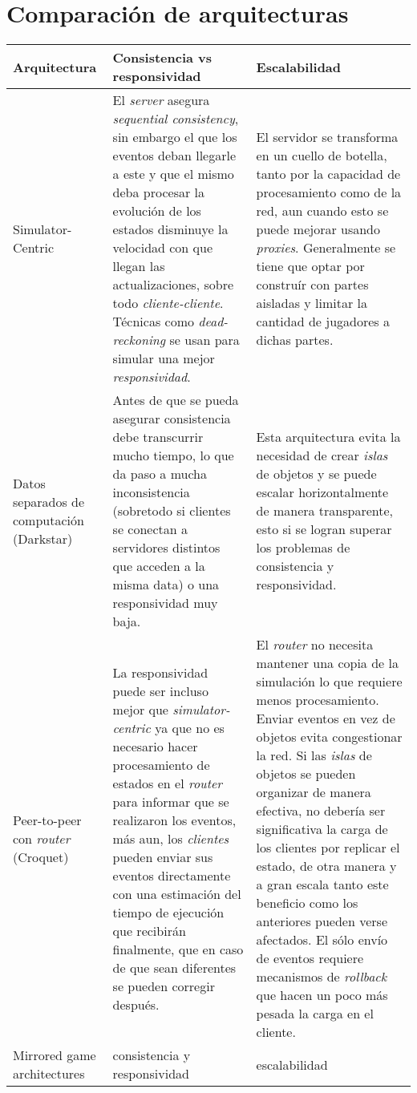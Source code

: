 \section{Comparación de arquitecturas}

%

\small
\begin{longtable}{|p{3cm}|p{6cm}|p{6cm}|}
\hline
\textbf{Arquitectura} & \textbf{Consistencia vs responsividad} & \textbf{Escalabilidad} \\ \hline
Simulator-Centric &
El \emph{server} asegura \emph{sequential consistency}, sin embargo el que los eventos deban llegarle a este y que el mismo deba procesar la evolución de los estados disminuye la velocidad con que llegan las actualizaciones, sobre todo \emph{cliente-cliente}. Técnicas como \emph{dead-reckoning} se usan para simular una mejor \emph{responsividad}. &
El servidor se transforma en un cuello de botella, tanto por la capacidad de procesamiento como de la red, aun cuando esto se puede mejorar usando \emph{proxies}. Generalmente se tiene que optar por construír con partes aisladas y limitar la cantidad de jugadores a dichas partes. \\
\hline
Datos separados de computación (Darkstar) &
Antes de que se pueda asegurar consistencia debe transcurrir mucho tiempo, lo que da paso a mucha inconsistencia (sobretodo si clientes se conectan a servidores distintos que acceden a la misma data) o una responsividad muy baja. &
Esta arquitectura evita la necesidad de crear \emph{islas} de objetos y se puede escalar horizontalmente de manera transparente, esto si se logran superar los problemas de consistencia y responsividad. \\
\hline
Peer-to-peer con \emph{router} (Croquet) &
La responsividad puede ser incluso mejor que \emph{simulator-centric} ya que no es necesario hacer procesamiento de estados en el \emph{router} para informar que se realizaron los eventos, más aun, los \emph{clientes} pueden enviar sus eventos directamente con una estimación del tiempo de ejecución que recibirán finalmente, que en caso de que sean diferentes se pueden corregir después. &
El \emph{router} no necesita mantener una copia de la simulación lo que requiere menos procesamiento. \newline
Enviar eventos en vez de objetos evita congestionar la red. \newline
Si las \emph{islas} de objetos se pueden organizar de manera efectiva, no debería ser significativa la carga de los clientes por replicar el estado, de otra manera y a gran escala tanto este beneficio como los anteriores pueden verse afectados. \newline El sólo envío de eventos requiere mecanismos de \emph{rollback} que hacen un poco más pesada la carga en el cliente. \\
\hline
Mirrored game architectures &
consistencia y responsividad &
escalabilidad \\
\hline
\end{longtable}
\normalsize

